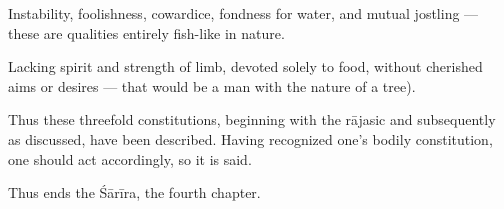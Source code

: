 \begin{translation}

\newpage
\begin{tt}
    \raggedright
    \bigskip 

\item[96]

Instability, foolishness, cowardice, fondness for water, and mutual jostling — these are qualities entirely fish-like in nature.


\item[97]

Lacking spirit and strength of limb, devoted solely to food, without cherished aims or desires  — that would be a man with the nature of a tree).

\item[98]

Thus these threefold constitutions, beginning with the rājasic and subsequently as discussed, have been described. Having recognized one’s bodily constitution, one should act accordingly, so it is said. 

\item[99]

Thus ends the Śārīra, the fourth chapter.

\end{tt}
\end{translation}